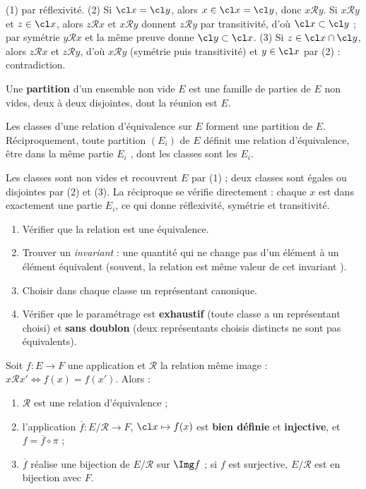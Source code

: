 \begin{preuve}
(1) par réflexivité. (2) Si $\cl x=\cl y$, alors $x\in\cl x=\cl y$, donc $x\mathcal R y$. Si $x\mathcal R y$ et $z\in\cl x$, alors $z\mathcal R x$ et $x\mathcal R y$ donnent $z\mathcal R y$ par transitivité, d'où $\cl x\subset\cl y$ ; par symétrie $y\mathcal R x$ et la même preuve donne $\cl y\subset\cl x$. (3) Si $z\in\cl x\cap\cl y$, alors $z\mathcal R x$ et $z\mathcal R y$, d'où $x\mathcal R y$ (symétrie puis transitivité) et $y\in\cl x$ par (2) : contradiction.
\end{preuve}
\begin{definition}[Partition]
Une \textbf{partition} d'un ensemble non vide $E$ est une famille de parties de $E$ non vides, deux à deux disjointes, dont la réunion est $E$.
\end{definition}
\begin{corollaire}\label{cor-partition}
Les classes d'une relation d'équivalence sur $E$ forment une partition de $E$. Réciproquement, toute partition $(E_i)$ de $E$ définit une relation d'équivalence, \og être dans la même partie $E_i$ \fg, dont les classes sont les $E_i$.
\end{corollaire}
\begin{preuve}
Les classes sont non vides et recouvrent $E$ par (1) ; deux classes sont égales ou disjointes par (2) et (3). La réciproque se vérifie directement : chaque $x$ est dans exactement une partie $E_i$, ce qui donne réflexivité, symétrie et transitivité.
\end{preuve}
\begin{methode}
\begin{enumerate}
\item Vérifier que la relation est une équivalence.
\item Trouver un \emph{invariant} : une quantité qui ne change pas d'un élément à un élément équivalent (souvent, la relation est \og même valeur de cet invariant \fg).
\item Choisir dans chaque classe un représentant canonique.
\item Vérifier que le paramétrage est \textbf{exhaustif} (toute classe a un représentant choisi) et \textbf{sans doublon} (deux représentants choisis distincts ne sont pas équivalents).
\end{enumerate}
\end{methode}
\begin{theoreme}\label{thm-factorisation}
Soit $f:E\to F$ une application et $\mathcal R$ la relation \og même image \fg{} : $x\mathcal R x'\iff f(x)=f(x')$. Alors :
\begin{enumerate}
\item $\mathcal R$ est une relation d'équivalence ;
\item l'application $\overline f:E/\mathcal R\to F$, $\cl x\mapsto f(x)$ est \textbf{bien définie} et \textbf{injective}, et $f=\overline f\circ\pi$ ;
\item $\overline f$ réalise une bijection de $E/\mathcal R$ sur $\Img f$ ; si $f$ est surjective, $E/\mathcal R$ est en bijection avec $F$.
\end{enumerate}
\end{theoreme}
